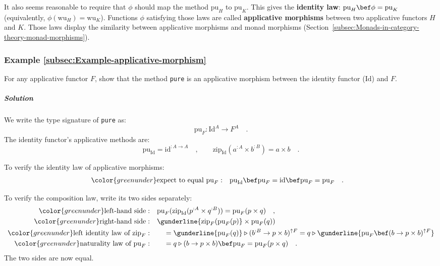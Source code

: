 It also seems reasonable to require that $\phi$ should map the method
$\text{pu}_{H}$ to $\text{pu}_{K}$. This gives the \textbf{identity
law}: $\text{pu}_{H}\bef\phi=\text{pu}_{K}$ (equivalently, $\phi(\text{wu}_{H})=\text{wu}_{K}$).
Functions $\phi$ satisfying those laws are called \textbf{applicative
morphisms} between two applicative functors
$H$ and $K$. Those laws display the similarity between applicative
morphisms and monad morphisms (Section~\ref{subsec:Monads-in-category-theory-monad-morphisms}).

\subsubsection{Example \label{subsec:Example-applicative-morphism}\ref{subsec:Example-applicative-morphism}}

For any applicative functor $F$, show that the method \lstinline!pure!
is an applicative morphism between the identity functor ($\text{Id}$)
and $F$.

\subparagraph{Solution}

We write the type signature of \lstinline!pure! as:
\[
\text{pu}_{F}:\text{Id}^{A}\rightarrow F^{A}\quad.
\]
The identity functor\textsf{'}s applicative methods are:
\[
\text{pu}_{\text{Id}}=\text{id}^{:A\rightarrow A}\quad,\quad\quad\text{zip}_{\text{Id}}(a^{:A}\times b^{:B})=a\times b\quad.
\]

To verify the identity law of applicative morphisms:
\begin{align*}
{\color{greenunder}\text{expect to equal }\text{pu}_{F}:}\quad & \text{pu}_{\text{Id}}\bef\text{pu}_{F}=\text{id}\bef\text{pu}_{F}=\text{pu}_{F}\quad.
\end{align*}

To verify the composition law, write its two sides separately:
\begin{align*}
{\color{greenunder}\text{left-hand side}:}\quad & \text{pu}_{F}(\text{zip}_{\text{Id}}(p^{:A}\times q^{:B}))=\text{pu}_{F}(p\times q)\quad,\\
{\color{greenunder}\text{right-hand side}:}\quad & \gunderline{\text{zip}_{F}(\text{pu}_{F}(p)}\times\text{pu}_{F}(q))\\
{\color{greenunder}\text{left identity law of }\text{zip}_{F}:}\quad & \quad=\gunderline{\text{pu}_{F}(q)}\triangleright(b^{:B}\rightarrow p\times b)^{\uparrow F}=q\triangleright\gunderline{\text{pu}_{F}\bef(b\rightarrow p\times b)^{\uparrow F}}\\
{\color{greenunder}\text{naturality law of }\text{pu}_{F}:}\quad & \quad=q\triangleright(b\rightarrow p\times b)\bef\text{pu}_{F}=\text{pu}_{F}(p\times q)\quad.
\end{align*}
The two sides are now equal.

